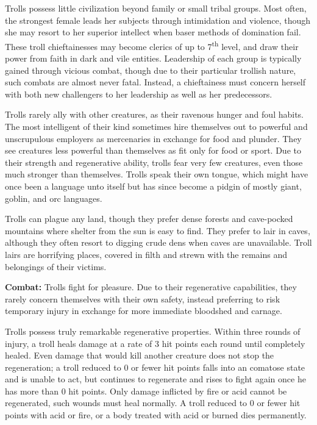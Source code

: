 \begin{multicols}{2}
Trolls possess little civilization beyond family or small tribal groups. Most often, the strongest female leads her subjects through intimidation and violence, though she may resort to her superior intellect when baser methods of domination fail. These troll chieftainesses may become clerics of up to 7\textsuperscript{th} level, and draw their power from faith in dark and vile entities. Leadership of each group is typically gained through vicious combat, though due to their particular trollish nature, such combats are almost never fatal. Instead, a chieftainess must concern herself with both new challengers to her leadership as well as her predecessors.

Trolls rarely ally with other creatures, as their ravenous hunger and foul habits. The most intelligent of their kind sometimes hire themselves out to powerful and unscrupulous employers as mercenaries in exchange for food and plunder. They see creatures less powerful than themselves as fit only for food or sport. Due to their strength and regenerative ability, trolls fear very few creatures, even those much stronger than themselves. Trolls speak their own tongue, which might have once been a language unto itself but has since become a pidgin of mostly giant, goblin, and orc languages.

Trolls can plague any land, though they prefer dense forests and cave-pocked mountains where shelter from the sun is easy to find. They prefer to lair in caves, although they often resort to digging crude dens when caves are unavailable. Troll lairs are horrifying places, covered in filth and strewn with the remains and belongings of their victims.

\textbf{Combat:} Trolls fight for pleasure. Due to their regenerative capabilities, they rarely concern themselves with their own safety, instead preferring to risk temporary injury in exchange for more immediate bloodshed and carnage. 

Trolls possess truly remarkable regenerative properties. Within three rounds of injury, a troll heals damage at a rate of 3 hit points each round until completely healed. Even damage that would kill another creature does not stop the regeneration; a troll reduced to 0 or fewer hit points falls into an comatose state and is unable to act, but continues to regenerate and rises to fight again once he has more than 0 hit points. Only damage inflicted by fire or acid cannot be regenerated, such wounds must heal normally. A troll reduced to 0 or fewer hit points with acid or fire, or a body treated with acid or burned dies permanently.


\end{multicols}
